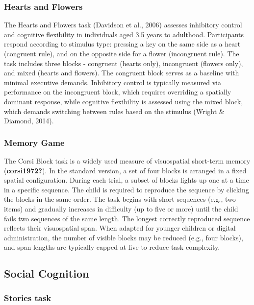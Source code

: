 \documentclass[
  english,
  man]{apa6}
\begin{document}
\subsubsection{Hearts and Flowers}\label{hearts-and-flowers}

The Hearts and Flowers task (Davidson et al., 2006) assesses inhibitory control and cognitive flexibility in individuals aged 3.5 years to adulthood. Participants respond according to stimulus type: pressing a key on the same side as a heart (congruent rule), and on the opposite side for a flower (incongruent rule). The task includes three blocks - congruent (hearts only), incongruent (flowers only), and mixed (hearts and flowers). The congruent block serves as a baseline with minimal executive demands. Inhibitory control is typically measured via performance on the incongruent block, which requires overriding a spatially dominant response, while cognitive flexibility is assessed using the mixed block, which demands switching between rules based on the stimulus (Wright \& Diamond, 2014).

\subsubsection{Memory Game}\label{memory-game}

The Corsi Block task is a widely used measure of visuospatial short-term memory (\textbf{corsi1972?}). In the standard version, a set of four blocks is arranged in a fixed spatial configuration. During each trial, a subset of blocks lights up one at a time in a specific sequence. The child is required to reproduce the sequence by clicking the blocks in the same order. The task begins with short sequences (e.g., two items) and gradually increases in difficulty (up to five or more) until the child fails two sequences of the same length. The longest correctly reproduced sequence reflects their visuospatial span. When adapted for younger children or digital administration, the number of visible blocks may be reduced (e.g., four blocks), and span lengths are typically capped at five to reduce task complexity.

\subsection{Social Cognition}\label{social-cognition}

\subsubsection{Stories task}\label{stories-task}
\end{document}
